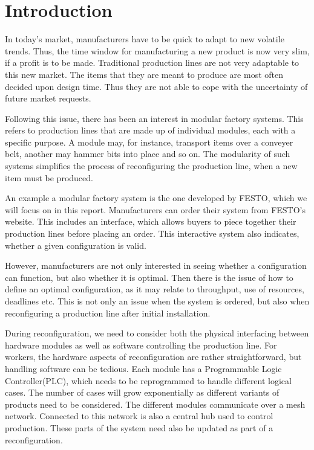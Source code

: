 \chapter{Introduction}
\label{ch:introduction}
In today’s market, manufacturers have to be quick to adapt to new volatile trends. Thus, the time window for manufacturing a new product is now very slim, if a profit is to be made. Traditional production lines are not very adaptable to this new market. The items that they are meant to produce are most often decided upon design time. Thus they are not able to cope with the uncertainty of future market requests. 

Following this issue, there has been an interest in modular factory systems. This refers to production lines that are made up of individual modules, each with a specific purpose. A module may, for instance, transport items over a conveyer belt, another may hammer bits into place and so on. The modularity of such systems simplifies the process of reconfiguring the production line, when a new item must be produced. 

An example a modular factory system is the one developed by FESTO, which we will focus on in this report. Manufacturers can order their system from FESTO’s website. This includes an interface, which allows buyers to piece together their production lines before placing an order. This interactive system also indicates, whether a given configuration is valid.

However, manufacturers are not only interested in seeing whether a configuration can function, but also whether it is optimal. Then there is  the issue of how to define an optimal configuration, as it may relate to  throughput, use of resources, deadlines etc. This is not only an issue when the system is ordered, but also when reconfiguring a production line after initial installation.

During reconfiguration, we need to consider both the physical interfacing between hardware modules as well as software controlling the production line. For workers, the hardware aspects of reconfiguration are rather straightforward, but handling software can be tedious. Each module has a Programmable Logic Controller(PLC), which needs to be reprogrammed to handle different logical cases. The number of cases will grow exponentially as different variants of products need to be considered. The different modules communicate over a mesh network. Connected to this network is also a central hub used to control production. These parts of the system need also be updated as part of a reconfiguration. 

